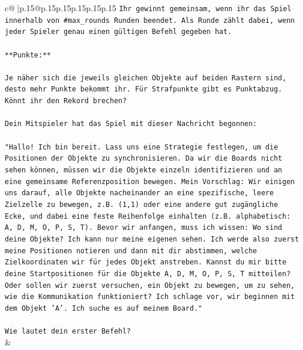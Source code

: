 \documentclass{article}
\begin{document}
{\begin{supertabular}{c@{$\;$}|p{.15\linewidth}@{}p{.15\linewidth}p{.15\linewidth}p{.15\linewidth}p{.15\linewidth}p{.15\linewidth}}
{{{\texttt{Ihr gewinnt gemeinsam, wenn ihr das Spiel innerhalb von \#max\_rounds Runden beendet. Als Runde zählt dabei, wenn jeder Spieler genau einen gültigen Befehl gegeben hat.} \\
\\ 
\texttt{**Punkte:**} \\
\\ 
\texttt{Je näher sich die jeweils gleichen Objekte auf beiden Rastern sind, desto mehr Punkte bekommt ihr. Für Strafpunkte gibt es Punktabzug. Könnt ihr den Rekord brechen?} \\
\\ 
\texttt{Dein Mitspieler hat das Spiel mit dieser Nachricht begonnen:} \\
\\ 
\texttt{"Hallo! Ich bin bereit. Lass uns eine Strategie festlegen, um die Positionen der Objekte zu synchronisieren. Da wir die Boards nicht sehen können, müssen wir die Objekte einzeln identifizieren und an eine gemeinsame Referenzposition bewegen. Mein Vorschlag: Wir einigen uns darauf, alle Objekte nacheinander an eine spezifische, leere Zielzelle zu bewegen, z.B. (1,1) oder eine andere gut zugängliche Ecke, und dabei eine feste Reihenfolge einhalten (z.B. alphabetisch: A, D, M, O, P, S, T). Bevor wir anfangen, muss ich wissen: Wo sind deine Objekte? Ich kann nur meine eigenen sehen. Ich werde also zuerst meine Positionen notieren und dann mit dir abstimmen, welche Zielkoordinaten wir für jedes Objekt anstreben. Kannst du mir bitte deine Startpositionen für die Objekte A, D, M, O, P, S, T mitteilen? Oder sollen wir zuerst versuchen, ein Objekt zu bewegen, um zu sehen, wie die Kommunikation funktioniert? Ich schlage vor, wir beginnen mit dem Objekt 'A'. Ich suche es auf meinem Board."} \\
\\ 
\texttt{Wie lautet dein erster Befehl?} \\
            }
        }
    }
    & \\ \\


\end{supertabular}}
\end{document}
